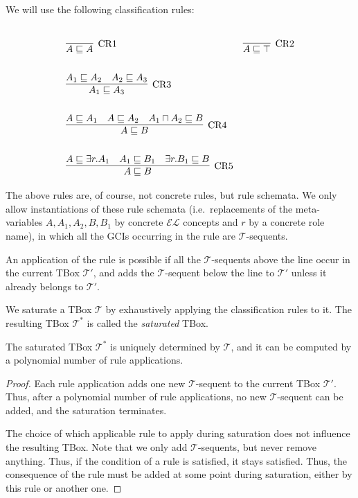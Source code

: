 \newpage
{}
We will use the following classification rules:
\begin{mdframed}[frametitle=Classification rules for $\mathcal{EL}$, nobreak=true]
	\begin{align*}
		&\infer[\text{CR1}]{A \sqsubseteq A}\\
		&\infer[\text{CR2}]{A \sqsubseteq \top}\\\\\\
		&\infer[\text{CR3}]{A_1 \sqsubseteq A_3}{A_1 \sqsubseteq A_2 & A_2 \sqsubseteq A_3}\\\\
		&\infer[\text{CR4}]{A \sqsubseteq B}{A \sqsubseteq A_1 & A \sqsubseteq A_2 & A_1 \sqcap A_2 \sqsubseteq B}\\\\
		&\infer[\text{CR5}]{A \sqsubseteq B}{A \sqsubseteq \exists r.A_1 & A_1 \sqsubseteq B_1 & \exists r.B_1 \sqsubseteq B}
	\end{align*}
\end{mdframed}
\begin{note}
	The above rules are, of course, not concrete rules, but rule schemata.
	We only allow instantiations of these rule schemata
	(i.e.\ replacements of the meta-variables $A, A_1, A_2, B, B_1$ by concrete $\mathcal{EL}$ concepts and $r$ by a concrete role name),
	in which all the GCIs occurring in the rule are $\mathcal{T}$-sequents.

	An application of the rule is possible if all the $\mathcal{T}$-sequents above the line occur in the current TBox $\mathcal{T}'$,
	and adds the $\mathcal{T}$-sequent below the line to $\mathcal{T}'$ unless it already belongs to $\mathcal{T}'$.
\end{note}

We saturate a TBox $\mathcal{T}$ by exhaustively applying the classification rules to it.
The resulting TBox $\mathcal{T}^{*}$ is called the \textit{saturated} TBox.

\begin{lemma}
	The saturated TBox $\mathcal{T}^*$ is uniquely determined by $\mathcal{T}$,
	and it can be computed by a polynomial number of rule applications.
\end{lemma}
\begin{proof}
	Each rule application adds one new $\mathcal{T}$-sequent to the current TBox $\mathcal{T}'$.
	Thus, after a polynomial number of rule applications, no new $\mathcal{T}$-sequent can be added,
	and the saturation terminates.

	The choice of which applicable rule to apply during saturation does not influence the resulting TBox.
	Note that we only add $\mathcal{T}$-sequents, but never remove anything.
	Thus, if the condition of a rule is satisfied, it stays satisfied.
	Thus, the consequence of the rule must be added at some point during saturation,
	either by this rule or another one.
\end{proof}

